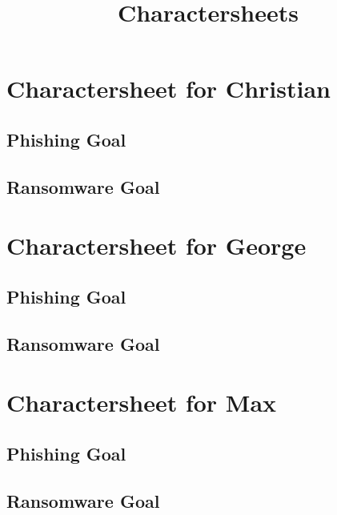 \documentclass{../../extra/styles/SecureRole}
\title{Charactersheets}
\begin{document}
\makecover
\newpage

\tableofcontents
\newpage

\chapter{Charactersheet for Christian}
\section{Phishing Goal}

\section{Ransomware Goal}





\chapter{Charactersheet for George}
\section{Phishing Goal}

\section{Ransomware Goal}






\chapter{Charactersheet for Max}
\section{Phishing Goal}

\section{Ransomware Goal}




\end{document}
